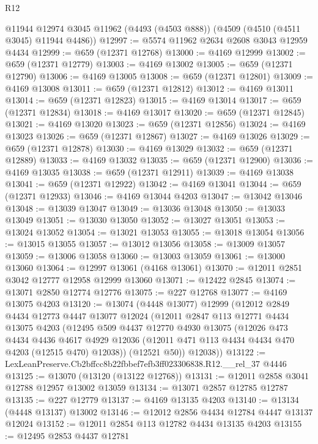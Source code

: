 \begin{lexlean}{R12}
\begin{coremodule}
    @11944
    @12974
    @3045
    @11962
    (@4493 (@4503 @888))
    (@4509 (@4510 (@4511 @3045) @11944 @4486))
@12997 := @5574 @11962 @2634 @2608 @3043 @12959 @4434
@12999 := @659 (@12371 @12768)
@13000 := @4169 @12999
@13002 := @659 (@12371 @12779)
@13003 := @4169 @13002
@13005 := @659 (@12371 @12790)
@13006 := @4169 @13005
@13008 := @659 (@12371 @12801)
@13009 := @4169 @13008
@13011 := @659 (@12371 @12812)
@13012 := @4169 @13011
@13014 := @659 (@12371 @12823)
@13015 := @4169 @13014
@13017 := @659 (@12371 @12834)
@13018 := @4169 @13017
@13020 := @659 (@12371 @12845)
@13021 := @4169 @13020
@13023 := @659 (@12371 @12856)
@13024 := @4169 @13023
@13026 := @659 (@12371 @12867)
@13027 := @4169 @13026
@13029 := @659 (@12371 @12878)
@13030 := @4169 @13029
@13032 := @659 (@12371 @12889)
@13033 := @4169 @13032
@13035 := @659 (@12371 @12900)
@13036 := @4169 @13035
@13038 := @659 (@12371 @12911)
@13039 := @4169 @13038
@13041 := @659 (@12371 @12922)
@13042 := @4169 @13041
@13044 := @659 (@12371 @12933)
@13046 := @4169 @13044 @4203
@13047 := @13042 @13046
@13048 := @13039 @13047
@13049 := @13036 @13048
@13050 := @13033 @13049
@13051 := @13030 @13050
@13052 := @13027 @13051
@13053 := @13024 @13052
@13054 := @13021 @13053
@13055 := @13018 @13054
@13056 := @13015 @13055
@13057 := @13012 @13056
@13058 := @13009 @13057
@13059 := @13006 @13058
@13060 := @13003 @13059
@13061 := @13000 @13060
@13064 := @12997 @13061 (@4168 @13061)
@13070 := @12011 @2851 @3042 @12777 @12958 @12999 @13060
@13071 := @12422 @2845
@13074 := @13071 @2850 @12774 @12776
@13075 := @227 @12768
@13077 := @4169 @13075 @4203
@13120 := @13074
    (@4448 @13077)
    @12999
    (@12012
      @2849
      @4434
      @12773
      @4447
      @13077
      @12024
      (@12011
        @2847
        @113
        @12771
        @4434
        @13075
        @4203
        (@12495
          @509
          @4437
          @12770
          @4930
          @13075
          (@12026
            @473
            @4434
            @4436
            @4617
            @4929
            @12036
            (@12011 @471 @113 @4434 @4434 @470 @4203 (@12515 @470) @12038))
          (@12521 @50))
        @12038))
@13122 := LexLeanPreserve.Cb2bffcc8b22fbbef7efb3ff023306838.R12.__rel_37 @4446
@13125 := @13070 (@13120 (@13122 @12768))
@13131 := @12011 @2858 @3041 @12788 @12957 @13002 @13059
@13134 := @13071 @2857 @12785 @12787
@13135 := @227 @12779
@13137 := @4169 @13135 @4203
@13140 := @13134 (@4448 @13137) @13002
@13146 := @12012 @2856 @4434 @12784 @4447 @13137 @12024
@13152 := @12011 @2854 @113 @12782 @4434 @13135 @4203
@13155 := @12495 @2853 @4437 @12781

\end{coremodule}
\end{lexlean}

